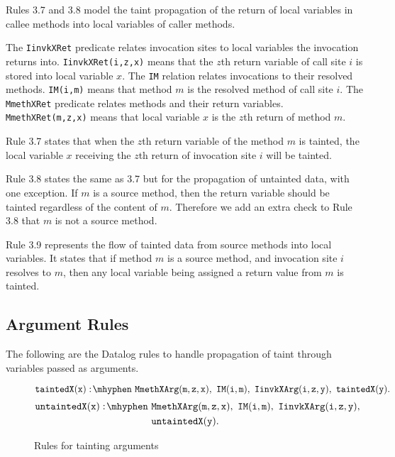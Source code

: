 Rules 3.7 and 3.8 model the taint propagation of the return of local
variables in callee methods into local variables of caller methods.

The \texttt{IinvkXRet} predicate relates invocation sites to local
variables the invocation returns into. \texttt{IinvkXRet(i,z,x)} means
that the $z$th return variable of call site $i$ is stored into local
variable $x$. The \texttt{IM} relation relates invocations to their
resolved methods. \texttt{IM(i,m)} means that method $m$ is the
resolved method of call site $i$. The \texttt{MmethXRet} predicate
relates methods and their return variables. \texttt{MmethXRet(m,z,x)}
means that local variable $x$ is the $z$th return of method $m$.

Rule 3.7 states that when the $z$th return variable of the method $m$
is tainted, the local variable $x$ receiving the $z$th return of
invocation site $i$ will be tainted.

Rule 3.8 states the same as 3.7 but for the propagation of untainted
data, with one exception. If $m$ is a source method, then the return
variable should be tainted regardless of the content of $m$. Therefore
we add an extra check to Rule 3.8 that $m$ is not a source method.

Rule 3.9 represents the flow of tainted data from source methods into
local variables. It states that if method $m$ is a source method, and
invocation site $i$ resolves to $m$, then any local variable being
assigned a return value from $m$ is tainted.
\subsection{Argument Rules}
The following are the Datalog rules to handle propagation of taint
through variables passed as arguments.
\begin{figure}[H]
\begin{equation}
  \mathtt{taintedX(x) \is MmethXArg(m,z,x) \also IM(i,m) \also
    IinvkXArg(i,z,y) \also taintedX(y).}
\end{equation}
\begin{equation}
  \begin{split}
    \mathtt{untaintedX(x) \is} & \mathtt{MmethXArg(m,z,x) \also
      IM(i,m) \also IinvkXArg(i,z,y) \also} \\ &
    \mathtt{untaintedX(y).} \\
  \end{split}
\end{equation}
\caption{Rules for tainting arguments}\label{fig:args}
\end{figure}

